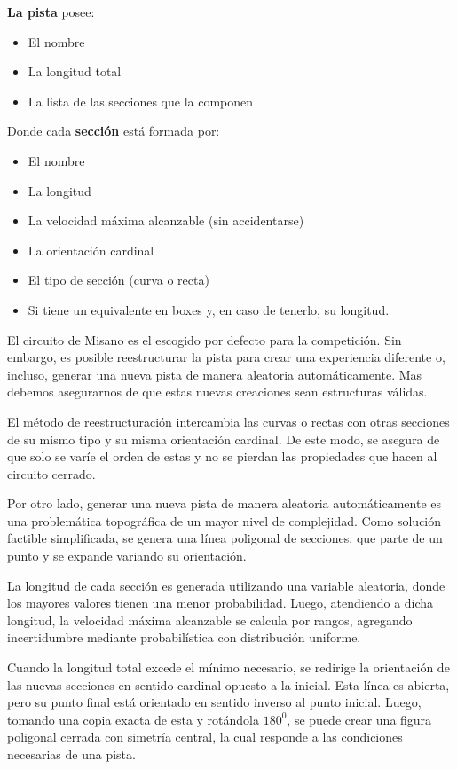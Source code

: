 \documentclass[12pt, letterpaper,spanish]{article}
\theoremstyle{definition}
\theoremstyle{remark}
\begin{document}
		\textbf{La pista} posee:
		\begin{itemize}
    		\item El nombre
		\item La longitud total
		\item La lista de las secciones que la componen
		\end{itemize}

		Donde cada \textbf{sección} está formada por:
		\begin{itemize}
    		\item El nombre
    		\item La longitud
		\item La velocidad máxima alcanzable (sin accidentarse)
		\item La orientación cardinal
		\item El tipo de sección (curva o recta)
		\item Si tiene un equivalente en boxes y, en caso de tenerlo, su longitud.
		\end{itemize}
		
		El circuito de Misano es el escogido por defecto para la competición. Sin embargo, es posible reestructurar la pista para crear una experiencia diferente o, incluso, generar una nueva pista de manera aleatoria automáticamente. Mas debemos asegurarnos de que estas nuevas creaciones sean estructuras válidas.

		El método de reestructuración intercambia las curvas o rectas con otras secciones de su mismo tipo y su misma orientación cardinal. De este modo, se asegura de que solo se varíe el orden de estas y no se pierdan las propiedades que hacen al circuito cerrado.

		Por otro lado, generar una nueva pista de manera aleatoria automáticamente es una problemática topográfica de un mayor nivel de complejidad. Como solución factible simplificada, se genera una línea poligonal de secciones, que parte de un punto y se expande variando su orientación. 

		La longitud de cada sección es generada utilizando una variable aleatoria, donde los mayores valores tienen una menor probabilidad. Luego, atendiendo a dicha longitud, la velocidad máxima alcanzable se calcula por rangos, agregando incertidumbre mediante probabilística con distribución uniforme.

		Cuando la longitud total excede el mínimo necesario, se redirige la orientación de las nuevas secciones en sentido cardinal opuesto a la inicial. Esta línea es abierta, pero su punto final está orientado en sentido inverso al punto inicial. Luego, tomando una copia exacta de esta y rotándola $180^0$, se puede crear una figura poligonal cerrada con simetría central, la cual responde a las condiciones necesarias de una pista.
\end{document}
